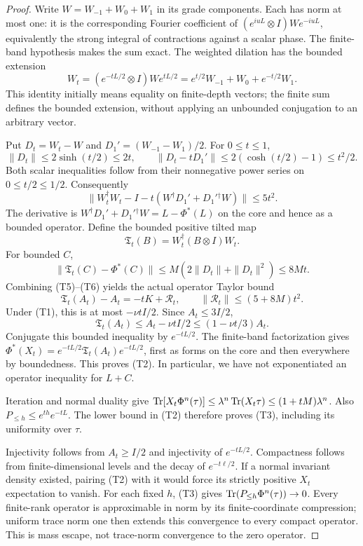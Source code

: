 \begin{proof}
Write $W=W_{-1}+W_0+W_1$ in its grade components. Each has norm at most one:
it is the corresponding Fourier coefficient of
$(e^{iuL}\otimes I)We^{-iuL}$, equivalently the strong integral of contractions
against a scalar phase. The finite-band hypothesis makes the sum exact.
The weighted dilation has the bounded extension
\[
 W_t=(e^{-tL/2}\otimes I)We^{tL/2}
 =e^{t/2}W_{-1}+W_0+e^{-t/2}W_1.
\]
This identity initially means equality on finite-depth vectors; the finite
sum defines the bounded extension, without applying an unbounded conjugation
to an arbitrary vector.

Put $D_t=W_t-W$ and $D_1'=(W_{-1}-W_1)/2$. For $0\le t\le1$,
\[
 \|D_t\|\le2\sinh(t/2)\le2t,\qquad
 \|D_t-tD_1'\|\le2(\cosh(t/2)-1)\le t^2/2.
 \tag{T4}
\]
Both scalar inequalities follow from their nonnegative power series on
$0\le t/2\le1/2$. Consequently
\[
 \|W_t^\dagger W_t-I-t(W^\dagger D_1'+D_1'{}^\dagger W)\|
 \le5t^2.
 \tag{T5}
\]
The derivative is $W^\dagger D_1'+D_1'{}^\dagger W
=L-\Phi^*(L)$ on the core and hence as a bounded operator. Define the bounded
positive tilted map
\[
 \mathfrak T_t(B)=W_t^\dagger(B\otimes I)W_t.
\]
For bounded $C$,
\[
 \|\mathfrak T_t(C)-\Phi^*(C)\|
 \le M(2\|D_t\|+\|D_t\|^2)\le8Mt.
 \tag{T6}
\]
Combining (T5)--(T6) yields the actual operator Taylor bound
\[
 \mathfrak T_t(A_t)-A_t=-tK+\mathcal R_t,\qquad
 \|\mathcal R_t\|\le(5+8M)t^2.
 \tag{T7}
\]
Under (T1), this is at most $-\nu tI/2$. Since $A_t\le3I/2$,
\[
 \mathfrak T_t(A_t)\le A_t-\nu tI/2
 \le(1-\nu t/3)A_t.
\]
Conjugate this bounded inequality by $e^{-tL/2}$. The finite-band
factorization gives
$\Phi^*(X_t)=e^{-tL/2}\mathfrak T_t(A_t)e^{-tL/2}$, first as forms on the
core and then everywhere by boundedness. This proves (T2). In particular,
we have not exponentiated an operator inequality for $L+C$.

Iteration and normal duality give
$\operatorname{Tr}[X_t\Phi^n(\tau)]\le\lambda^n\operatorname{Tr}(X_t\tau)\le(1+tM)\lambda^n$.
Also $P_{\le h}\le e^{th}e^{-tL}$. The lower bound in (T2) therefore proves
(T3), including its uniformity over $\tau$.

Injectivity follows from $A_t\ge I/2$ and injectivity of $e^{-tL/2}$.
Compactness follows from finite-dimensional levels and the decay of
$e^{-t\ell/2}$. If a normal invariant density existed, pairing (T2) with it
would force its strictly positive $X_t$ expectation to vanish. For each
fixed $h$, (T3) gives $\operatorname{Tr}(P_{\le h}\Phi^n(\tau))\to0$. Every finite-rank
operator is approximable in norm by its finite-coordinate compression;
uniform trace norm one then extends this convergence to every compact
operator. This is mass escape, not trace-norm convergence to the zero
operator.
\end{proof}

